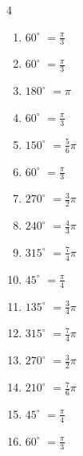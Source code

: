 \begin{multicols}{4}
\begin{enumerate}
\columnbreak %

\resetques

  \item $\displaystyle 60^{\circ}$
        $\displaystyle =\frac{\pi}{3}$

  \item $\displaystyle 60^{\circ}$
        $\displaystyle =\frac{\pi}{3}$

  \item $\displaystyle 180^{\circ}$
        $\displaystyle =\pi$

  \item $\displaystyle 60^{\circ}$
        $\displaystyle =\frac{\pi}{3}$

  \item $\displaystyle 150^{\circ}$
        $\displaystyle =\frac{5}{6}\pi$

  \item $\displaystyle 60^{\circ}$
        $\displaystyle =\frac{\pi}{3}$

  \item $\displaystyle 270^{\circ}$
        $\displaystyle =\frac{3}{2}\pi$

  \item $\displaystyle 240^{\circ}$
        $\displaystyle =\frac{4}{3}\pi$

  \item $\displaystyle 315^{\circ}$
        $\displaystyle =\frac{7}{4}\pi$

  \item $\displaystyle 45^{\circ}$
        $\displaystyle =\frac{\pi}{4}$

  \item $\displaystyle 135^{\circ}$
        $\displaystyle =\frac{3}{4}\pi$

  \item $\displaystyle 315^{\circ}$
        $\displaystyle =\frac{7}{4}\pi$

  \item $\displaystyle 270^{\circ}$
        $\displaystyle =\frac{3}{2}\pi$

  \item $\displaystyle 210^{\circ}$
        $\displaystyle =\frac{7}{6}\pi$

  \item $\displaystyle 45^{\circ}$
        $\displaystyle =\frac{\pi}{4}$

  \item $\displaystyle 60^{\circ}$
        $\displaystyle =\frac{\pi}{3}$


\end{enumerate}
\end{multicols}
